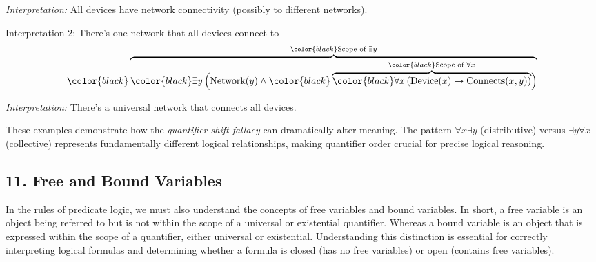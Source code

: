 \begin{enumerate}
  \emph{Interpretation:} All devices have network connectivity (possibly
  to different networks).

  Interpretation 2: There's one network that all devices connect to \[
   {\color{black}\overbrace{\color{black}\exists y \,
   \Big(
   \text{Network}(y) \wedge
   {\color{black}\overbrace{\color{black}\forall x \,
   ( \text{Device}(x) \rightarrow \text{Connects}(x,y) )
   }^{\color{black}\text{Scope of } \forall x}}
   \Big)
   }^{\color{black}\text{Scope of } \exists y}}
   \]

  \emph{Interpretation:} There's a universal network that connects all
  devices.
\end{enumerate}

These examples demonstrate how the \emph{quantifier shift fallacy} can
dramatically alter meaning. The pattern \(\forall x \exists y\)
(distributive) versus \(\exists y \forall x\) (collective) represents
fundamentally different logical relationships, making quantifier order
crucial for precise logical reasoning.

\subsection{11. Free and Bound
Variables}\label{free-and-bound-variables}

In the rules of predicate logic, we must also understand the concepts of
free variables and bound variables. In short, a free variable is an
object being referred to but is not within the scope of a universal or
existential quantifier. Whereas a bound variable is an object that is
expressed within the scope of a quantifier, either universal or
existential. Understanding this distinction is essential for correctly
interpreting logical formulas and determining whether a formula is
closed (has no free variables) or open (contains free variables).

